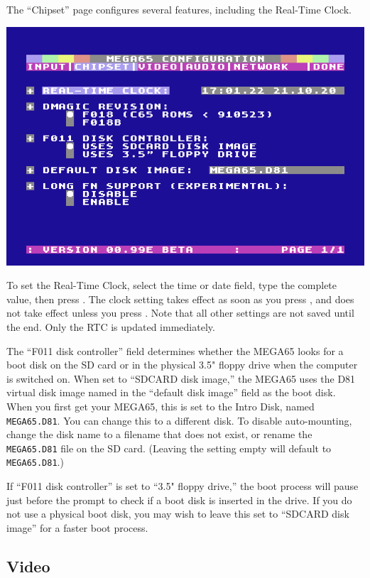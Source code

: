 The ``Chipset'' page configures several features, including the Real-Time Clock.

\begin{center}
  \includegraphics[width=0.7\linewidth]{images/ss-m65config-2.png}
\end{center}

To set the Real-Time Clock, select the time or date field, type the complete value, then press . The clock setting takes effect as soon as you press , and does not take effect unless you press . Note that all other settings are not saved until the end. Only the RTC is updated immediately.

The ``F011 disk controller'' field determines whether the MEGA65 looks for a boot disk on the SD card or in the physical 3.5" floppy drive when the computer is switched on. When set to ``SDCARD disk image,'' the MEGA65 uses the D81 virtual disk image named in the ``default disk image'' field as the boot disk. When you first get your MEGA65, this is set to the Intro Disk, named {\tt MEGA65.D81}. You can change this to a different disk. To disable auto-mounting, change the disk name to a filename that does not exist, or rename the {\tt MEGA65.D81} file on the SD card. (Leaving the setting empty will default to {\tt MEGA65.D81}.)

If ``F011 disk controller'' is set to ``3.5" floppy drive,'' the boot process will pause just before the  prompt to check if a boot disk is inserted in the drive. If you do not use a physical boot disk, you may wish to leave this set to ``SDCARD disk image'' for a faster boot process.

\subsection{Video}

